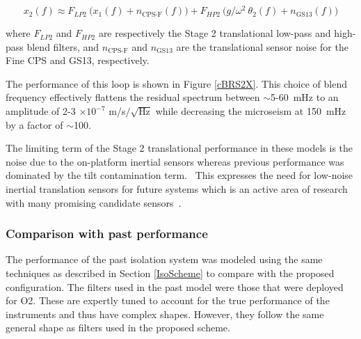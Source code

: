 \documentclass [12pt, proquest]{uwthesis}[2019]
\begin{document}
\begin{equation}
x_2(f)\approx F_{LP2}\ \big(x_1(f)+n_\text{CPS-F}(f)\big)+F_{HP2}\ \big( g/\omega^2\ \theta_2(f) +n_\text{GS13}(f) \big)
\end{equation}

where $F_{LP2}$ and $F_{HP2}$ are respectively the Stage 2 translational low-pass and high-pass blend filters, and $n_\text{CPS-F}$ and $n_\text{GS13}$ are the translational sensor noise for the Fine CPS and GS13, respectively.

The performance of this loop is shown in Figure \ref{cBRS2X}. This choice of blend frequency effectively flattens the residual spectrum between $\sim$5-60~mHz to an amplitude of 2-3 $\times 10^{-7}$ m/s$/\sqrt{\text{Hz}}$ while decreasing the microseism at 150~mHz by a factor of $\sim$100.

The limiting term of the Stage 2 translational performance in these models is the noise due to the on-platform inertial sensors whereas previous performance was dominated by the tilt contamination term.~\cite{windproofing} This expresses the need for low-noise inertial translation sensors for future systems which is an active area of research with many promising candidate sensors~\cite{Mow_Lowry_2019, Cooper_2018}. 

\subsubsection{Comparison with past performance}

The performance of the past isolation system was modeled using the same techniques as described in Section \ref{IsoScheme} to compare with the proposed configuration. The filters used in the past model were those that were deployed for O2. These are expertly tuned to account for the true performance of the instruments and thus have complex shapes. However, they follow the same general shape as filters used in the proposed scheme.
\end{document}
